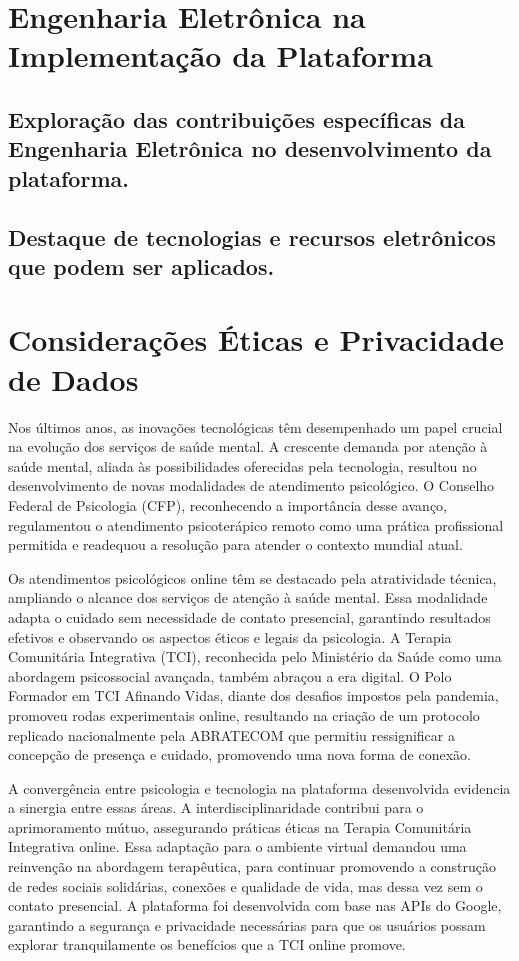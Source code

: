 \chapter{Engenharia Eletrônica na Implementação da Plataforma}
\section{Exploração das contribuições específicas da Engenharia Eletrônica no desenvolvimento da plataforma.}
\section{Destaque de tecnologias e recursos eletrônicos que podem ser aplicados.}

\chapter{Considerações Éticas e Privacidade de Dados}

Nos últimos anos, as inovações tecnológicas têm desempenhado um papel crucial na evolução dos serviços de saúde mental. A crescente demanda por atenção à saúde mental, aliada às possibilidades oferecidas pela tecnologia, resultou no desenvolvimento de novas modalidades de atendimento psicológico. O Conselho Federal de Psicologia (CFP), reconhecendo a importância desse avanço, regulamentou o atendimento psicoterápico remoto como uma prática profissional permitida e readequou a resolução para atender o contexto mundial atual.

Os atendimentos psicológicos online têm se destacado pela atratividade técnica, ampliando o alcance dos serviços de atenção à saúde mental. Essa modalidade adapta o cuidado sem necessidade de contato presencial, garantindo resultados efetivos e observando os aspectos éticos e legais da psicologia.\cite{SIEGMUND} A Terapia Comunitária Integrativa (TCI), reconhecida pelo Ministério da Saúde como uma abordagem psicossocial avançada, também abraçou a era digital. O Polo Formador em TCI Afinando Vidas, diante dos desafios impostos pela pandemia, promoveu rodas experimentais online, resultando na criação de um protocolo replicado nacionalmente pela ABRATECOM que permitiu ressignificar a concepção de presença e cuidado, promovendo uma nova forma de conexão. \cite{SILVAeOTAVIANO}

A convergência entre psicologia e tecnologia na plataforma desenvolvida evidencia a sinergia entre essas áreas. A interdisciplinaridade contribui para o aprimoramento mútuo, assegurando práticas éticas na Terapia Comunitária Integrativa online. Essa adaptação para o ambiente virtual demandou uma reinvenção na abordagem terapêutica, para continuar promovendo a construção de redes sociais solidárias, conexões e qualidade de vida, mas dessa vez sem o contato presencial. A plataforma foi desenvolvida com base nas APIs do Google, garantindo a segurança e privacidade necessárias para que os usuários possam explorar tranquilamente os benefícios que a TCI online promove. 

